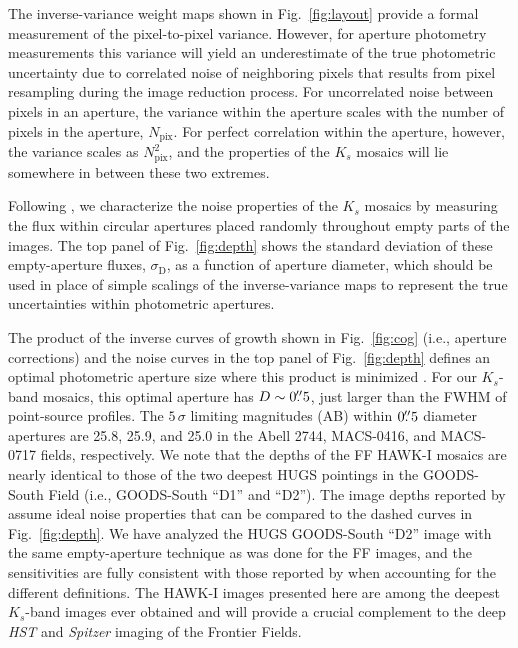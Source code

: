 \documentclass[iop, numberedappendix]{emulateapj}
\begin{document}
The inverse-variance weight maps shown in Fig.~\ref{fig:layout} provide a formal measurement of the pixel-to-pixel variance.  However, for aperture photometry measurements this variance will yield an underestimate of the true photometric uncertainty due to correlated noise of neighboring pixels that results from pixel resampling during the image reduction process.  For uncorrelated noise between pixels in an aperture, the variance within the aperture scales with the number of pixels in the aperture, $N_\mathrm{pix}$.  For perfect correlation within the aperture, however, the variance scales as $N_\mathrm{pix}^2$, and the properties of the $K_s$ mosaics will lie somewhere in between these two extremes.

Following \cite{labbe:03} \citep[see also][]{quadri:musyc, whitaker:nmbs, skelton:14}, we characterize the noise properties of the $K_s$ mosaics by measuring the flux within circular apertures placed randomly throughout empty parts of the images.  The top panel of Fig.~\ref{fig:depth} shows the standard deviation of these empty-aperture fluxes, $\sigma_\mathrm{D}$, as a function of aperture diameter, which should be used in place of simple scalings of the inverse-variance maps to represent the true uncertainties within photometric apertures.  

The product of the inverse curves of growth shown in Fig.~\ref{fig:cog} (i.e., aperture corrections) and the noise curves in the top panel of Fig.~\ref{fig:depth} defines an optimal photometric aperture size where this product is minimized \citep{whitaker:nmbs}.  For our $K_s$-band mosaics, this optimal aperture has $D\sim0\mbox{$.\!\!^{\prime\prime}$}5$, just larger than the FWHM of point-source profiles.  The $5\,\sigma$ limiting magnitudes (AB) within $0\mbox{$.\!\!^{\prime\prime}$}5$ diameter apertures are 25.8, 25.9, and 25.0 in the Abell 2744, MACS-0416, and MACS-0717 fields, respectively.  We note that the depths of the FF HAWK-I mosaics are nearly identical to those of the two deepest HUGS pointings in the GOODS-South Field (i.e., GOODS-South ``D1'' and ``D2'').  The image depths reported by \cite{hugs} assume ideal noise properties that can be compared to the dashed curves in Fig.~\ref{fig:depth}.  We have analyzed the HUGS GOODS-South ``D2'' image with the same empty-aperture technique as was done for the FF images, and the sensitivities are fully consistent with those reported by \cite{hugs} when accounting for the different definitions.  The HAWK-I images presented here are among the deepest $K_s$-band images ever obtained and will provide a crucial complement to the deep \textit{HST} and \textit{Spitzer} imaging of the Frontier Fields.
\end{document}
